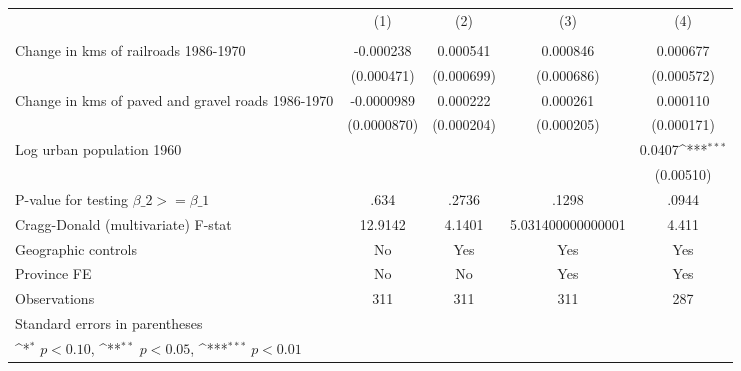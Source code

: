 {
\def\sym#1{\ifmmode^{#1}\else\(^{#1}\)\fi}
\begin{tabular}{l*{4}{c}}
\hline\hline
                &\multicolumn{1}{c}{(1)}&\multicolumn{1}{c}{(2)}&\multicolumn{1}{c}{(3)}&\multicolumn{1}{c}{(4)}\\
                &\multicolumn{1}{c}{}&\multicolumn{1}{c}{}&\multicolumn{1}{c}{}&\multicolumn{1}{c}{}\\
\hline
Change in kms of railroads 1986-1970&-0.000238         & 0.000541         & 0.000846         & 0.000677         \\
                &(0.000471)         &(0.000699)         &(0.000686)         &(0.000572)         \\
[1em]
Change in kms of paved and gravel roads 1986-1970&-0.0000989         & 0.000222         & 0.000261         & 0.000110         \\
                &(0.0000870)         &(0.000204)         &(0.000205)         &(0.000171)         \\
[1em]
Log urban population 1960&                  &                  &                  &   0.0407\sym{***}\\
                &                  &                  &                  &(0.00510)         \\
\hline
P-value for testing $\beta\_{2} >= \beta\_{1}$&     .634         &    .2736         &    .1298         &    .0944         \\
Cragg-Donald (multivariate) F-stat&  12.9142         &   4.1401         &5.031400000000001         &    4.411         \\
Geographic controls&       No         &      Yes         &      Yes         &      Yes         \\
Province FE     &       No         &       No         &      Yes         &      Yes         \\
Observations    &      311         &      311         &      311         &      287         \\
\hline\hline
\multicolumn{5}{l}{\footnotesize Standard errors in parentheses}\\
\multicolumn{5}{l}{\footnotesize \sym{*} \(p<0.10\), \sym{**} \(p<0.05\), \sym{***} \(p<0.01\)}\\
\end{tabular}
}
